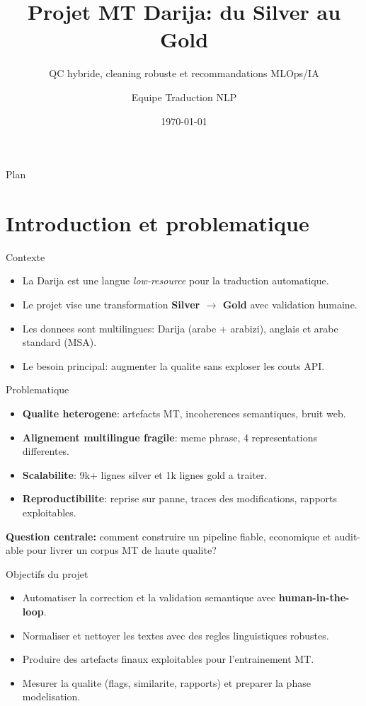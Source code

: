 \documentclass[10pt,aspectratio=169]{beamer}
\title{Projet MT Darija: du Silver au Gold}
\subtitle{QC hybride, cleaning robuste et recommandations MLOps/IA}
\author{Equipe Traduction NLP}
\institute{Projet R\&D Machine Translation}
\date{\today}
\begin{document}
\begin{frame}
  \titlepage
\end{frame}

\begin{frame}{Plan}
  \tableofcontents
\end{frame}

\section{Introduction et problematique}

\begin{frame}{Contexte}
  \begin{itemize}
    \item La Darija est une langue \emph{low-resource} pour la traduction automatique.
    \item Le projet vise une transformation \textbf{Silver $\rightarrow$ Gold} avec validation humaine.
    \item Les donnees sont multilingues: Darija (arabe + arabizi), anglais et arabe standard (MSA).
    \item Le besoin principal: augmenter la qualite sans exploser les couts API.
  \end{itemize}
\end{frame}

\begin{frame}{Problematique}
  \begin{itemize}
    \item \textbf{Qualite heterogene}: artefacts MT, incoherences semantiques, bruit web.
    \item \textbf{Alignement multilingue fragile}: meme phrase, 4 representations differentes.
    \item \textbf{Scalabilite}: 9k+ lignes silver et 1k lignes gold a traiter.
    \item \textbf{Reproductibilite}: reprise sur panne, traces des modifications, rapports exploitables.
  \end{itemize}

  \vspace{0.3cm}
  \textbf{Question centrale:} comment construire un pipeline fiable, economique et audit-able pour livrer un corpus MT de haute qualite?
\end{frame}

\begin{frame}{Objectifs du projet}
  \begin{itemize}
    \item Automatiser la correction et la validation semantique avec \textbf{human-in-the-loop}.
    \item Normaliser et nettoyer les textes avec des regles linguistiques robustes.
    \item Produire des artefacts finaux exploitables pour l'entrainement MT.
    \item Mesurer la qualite (flags, similarite, rapports) et preparer la phase modelisation.
  \end{itemize}
\end{frame}
\end{document}
